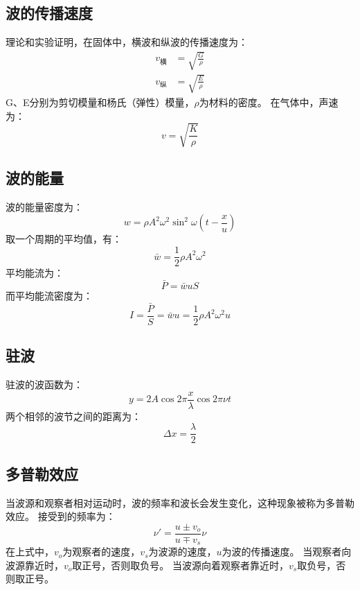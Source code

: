 \documentclass{ctexart}
\begin{document}
\subsection{波的传播速度}
理论和实验证明，在固体中，横波和纵波的传播速度为：
\begin{align*}
    v_{\text{横}} &= \sqrt{\frac{G}{\rho}} \\
    v_{\text{纵}} &= \sqrt{\frac{E}{\rho}}
\end{align*}
G、E分别为剪切模量和杨氏（弹性）模量，$\rho$为材料的密度。
在气体中，声速为：
$$
    v = \sqrt{\frac{K}{\rho}}
$$
\subsection{波的能量}
波的能量密度为：
$$
    w = \rho A^2 \omega^2 \sin^2 \omega\left(t - \frac{x}{u}\right)
$$
取一个周期的平均值，有：
$$
    \bar{w} = \frac{1}{2} \rho A^2 \omega^2
$$
平均能流为：
$$
    \bar{P} = \bar{w} u S
$$
而平均能流密度为：
$$
    I =\frac{\bar{P}}{S} = \bar{w}u = \frac{1}{2} \rho A^2 \omega^2 u
$$
\subsection{驻波}
驻波的波函数为：
$$
    y = 2A \cos 2\pi \frac{x}{\lambda} \cos 2\pi \nu t
$$
两个相邻的波节之间的距离为：
$$
    \Delta x = \frac{\lambda}{2}
$$
\subsection{多普勒效应}
当波源和观察者相对运动时，波的频率和波长会发生变化，这种现象被称为多普勒效应。
接受到的频率为：
$$
    \nu' = \frac{u \pm v_o}{u \mp v_s} \nu
$$
在上式中，$v_o$为观察者的速度，$v_s$为波源的速度，$u$为波的传播速度。
当观察者向波源靠近时，$v_o$取正号，否则取负号。
当波源向着观察者靠近时，$v_s$取负号，否则取正号。
\end{document}

